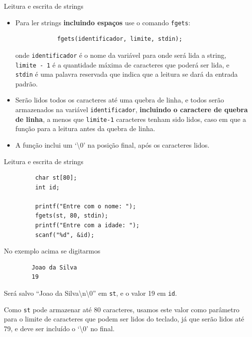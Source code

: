 \documentclass[handout]{beamer}
\newcommand{\cod}[1]{\texttt{#1}}
\begin{document}
\begin{frame}[fragile]{Leitura e escrita de strings}

    \small
    \begin{itemize}[<+->]
        \item Para ler strings {\bf incluindo espaços} use o comando \cod{fgets}:
        \begin{verbatim}
            fgets(identificador, limite, stdin);
        \end{verbatim}
        onde \cod{identificador} é o nome da variável para onde será lida a string, \cod{limite - 1} é a quantidade máxima de caracteres que poderá ser lida, e \cod{stdin} é uma palavra reservada que indica que a leitura se dará da entrada padrão.

        \item Serão lidos todos os caracteres até uma quebra de linha, e todos serão armazenados na variável \cod{identificador}, \textbf{incluindo o caractere de quebra de linha}, a menos que \cod{limite-1} caracteres tenham sido lidos, caso em que a função para a leitura antes da quebra de linha.

        \item A função inclui um `\textbackslash0' na posição final, após os caracteres lidos.
    \end{itemize}

\end{frame}

\begin{frame}[fragile]{Leitura e escrita de strings}

    \small
    \begin{verbatim}
         char st[80];
         int id;

         printf("Entre com o nome: ");
         fgets(st, 80, stdin);
         printf("Entre com a idade: ");
         scanf("%d", &id);
    \end{verbatim}

    No exemplo acima se digitarmos
    \begin{verbatim}
        Joao da Silva
        19
    \end{verbatim}

    Será salvo ``Joao da Silva\textbackslash{n}\textbackslash{0}'' em \cod{st}, e o valor 19 em \cod{id}.

    Como \cod{st} pode armazenar até 80 caracteres, usamos este valor como parâmetro para o limite de caracteres que podem ser lidos do teclado, já que serão lidos até 79, e deve ser incluído o `\textbackslash0' no final.

\end{frame}
\end{document}
